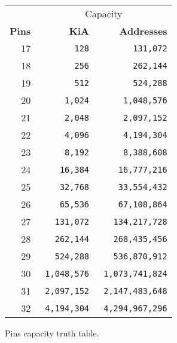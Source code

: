 \begin{figure}[H]
\begin{minipage}[t]{0.49\linewidth}
{\begin{tabular}{rrr}
  \toprule    
\end{tabular}%
}
\end{minipage}%
\begin{minipage}[t]{0.49\linewidth}
{ 
\setlength{\tabcolsep}{3.0pt}
\setlength\cmidrulewidth{\heavyrulewidth} %
\begin{tabular}{rrr}

  & \multicolumn{2}{c}{Capacity} \\
  \cmidrule(lr){2-3}
  
 
 \textbf{Pins} & \textbf{KiA} & \textbf{Addresses}\\               
            
  \toprule    
17   &    \texttt{128}           &      \texttt{131,072} \\
18  &    \texttt{ 256}           &      \texttt{ 262,144} \\
19   &    \texttt{512}           &\texttt{524,288}    \\
20           &\texttt{1,024}            &      \texttt{1,048,576} \\
21           &    \texttt{2,048} &\texttt{2,097,152}    \\
22           &    \texttt{4,096} &\texttt{4,194,304}    \\
23            &    \texttt{8,192} &      \texttt{8,388,608} \\
24           &    \texttt{16,384} &\texttt{16,777,216}    \\
25           &    \texttt{32,768} &      \texttt{33,554,432} \\
26            &\texttt{65,536}            &\texttt{67,108,864}    \\
27           &\texttt{131,072}            &\texttt{134,217,728}    \\
28           &    \texttt{262,144} &\texttt{268,435,456}    \\
29          &    \texttt{524,288} &\texttt{536,870,912}    \\
30          &    \texttt{1,048,576} &      \texttt{1,073,741,824} \\
31          &    \texttt{2,097,152} &      \texttt{2,147,483,648} \\
32          &    \texttt{ 4,194,304} &      \texttt{ 4,294,967,296} \\
  \toprule    
\end{tabular}%
}
\end{minipage}
\caption*{Pins capacity truth table.}
\end{figure}

